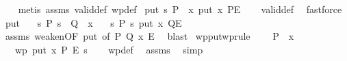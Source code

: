 \begin{isabellebody}
%
\isadelimproof
\ \ %
\endisadelimproof
%
\isatagproof
{}\isamarkupfalse%
\ {\isacharparenleft}{\kern0pt}metis\ assms\ valid{\isacharunderscore}{\kern0pt}def\ wp{\isacharunderscore}{\kern0pt}def{\isacharparenright}{\kern0pt}%
\endisatagproof
{\isafoldproof}%
%
\isadelimproof
\isanewline
%
\endisadelimproof
\isanewline
{}\isamarkupfalse%
\ put{\isacharcolon}{\kern0pt}\ {\isachardoublequoteopen}{\isasymlbrace}{\isasymlambda}s{\isachardot}{\kern0pt}\ P\ {\isacharparenleft}{\kern0pt}{\isacharparenright}{\kern0pt}\ x{\isasymrbrace}\ put\ x\ {\isasymlbrace}P{\isasymrbrace}{\isacharcomma}{\kern0pt}{\isasymlbrace}E{\isasymrbrace}{\isachardoublequoteclose}\isanewline
%
\isadelimproof
\ \ %
\endisadelimproof
%
\isatagproof
{}\isamarkupfalse%
\ valid{\isacharunderscore}{\kern0pt}def\ \isamarkupfalse%
\ fastforce%
\endisatagproof
{\isafoldproof}%
%
\isadelimproof
\isanewline
%
\endisadelimproof
\isanewline
{}\isamarkupfalse%
\ put{\isacharprime}{\kern0pt}{\isacharcolon}{\kern0pt}\isanewline
\ \ \ {\isachardoublequoteopen}{\isasymforall}s{\isachardot}{\kern0pt}\ P\ s\ {\isasymlongrightarrow}\ Q\ {\isacharparenleft}{\kern0pt}{\isacharparenright}{\kern0pt}\ x{\isachardoublequoteclose}\isanewline
\ \ \ {\isachardoublequoteopen}{\isasymlbrace}{\isasymlambda}s{\isachardot}{\kern0pt}\ P\ s{\isasymrbrace}\ put\ x\ {\isasymlbrace}Q{\isasymrbrace}{\isacharcomma}{\kern0pt}{\isasymlbrace}E{\isasymrbrace}{\isachardoublequoteclose}\isanewline
%
\isadelimproof
\ \ %
\endisadelimproof
%
\isatagproof
{}\isamarkupfalse%
\ assms\ weaken{\isacharbrackleft}{\kern0pt}OF\ put{\isacharcomma}{\kern0pt}\ of\ P\ Q\ x\ E{\isacharbrackright}{\kern0pt}\ \isamarkupfalse%
\ blast%
\endisatagproof
{\isafoldproof}%
%
\isadelimproof
\isanewline
%
\endisadelimproof
\isanewline
{}\isamarkupfalse%
\ wpput{\isacharbrackleft}{\kern0pt}wprule{\isacharbrackright}{\kern0pt}{\isacharcolon}{\kern0pt}\ \isanewline
\ \ \ {\isachardoublequoteopen}P\ {\isacharparenleft}{\kern0pt}{\isacharparenright}{\kern0pt}\ x{\isachardoublequoteclose}\isanewline
\ \ \ {\isachardoublequoteopen}wp\ {\isacharparenleft}{\kern0pt}put\ x{\isacharparenright}{\kern0pt}\ P\ E\ s{\isachardoublequoteclose}\isanewline
%
\isadelimproof
\ \ %
\endisadelimproof
%
\isatagproof
{}\isamarkupfalse%
\ wp{\isacharunderscore}{\kern0pt}def\ \isamarkupfalse%
\ assms\ \isamarkupfalse%
\ simp%
\endisatagproof

\end{isabellebody}
